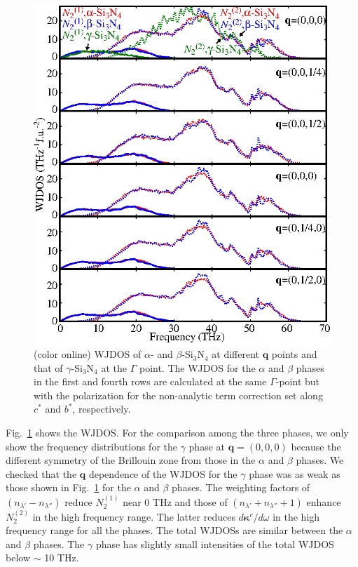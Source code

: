 \documentclass[twocolumn,amsmath,amssymb,a4paper,prb,superscriptaddress,floatfix]{revtex4-1}
\begin{document}
\begin{figure}[ht]
 \centering
  \includegraphics[width=0.9\linewidth]{figure_wjdoss.eps} \caption{(color
	  online) WJDOS of $\alpha$- and $\beta$-Si$_3$N$_4$ at different $\mathbf
	  q$ points and that of $\gamma$-Si$_3$N$_4$ at the $\Gamma$ point. 
  The WJDOS for the $\alpha$ and $\beta$ phases in the  first and fourth rows
  are calculated at the same $\Gamma$-point but 
  with the polarization for the non-analytic term correction set along $c^*$ and
  $b^*$, respectively. \label{fig:Fig6_338} }
 \centering
\end{figure}

Fig.~\ref{fig:Fig6_338} shows the WJDOS.  For the comparison among the three
phases, we only show the frequency distributions for the $\gamma$ phase at
$\mathbf{q}=(0,0,0)$ because the different symmetry of the Brillouin zone from
those in the $\alpha$ and $\beta$ phases. We checked that  the $\mathbf{q}$
dependence of the WJDOS for the $\gamma$ phase was as weak as those shown in
Fig.~\ref{fig:Fig6_338} for the $\alpha$ and $\beta$ phases. The weighting
factors of $(n_{\lambda'}-n_{\lambda''})$ reduce $N_2^{(1)}$ near 0 THz and
those of $(n_{\lambda'}+n_{\lambda''}+1)$ enhance $N_2^{(2)}$ in the high
frequency range. The latter reduces $d\boldsymbol{\kappa}^c/d\omega$ in the
high frequency range for all the phases.  The total WJDOSs are similar between
the $\alpha$ and $\beta$ phases.  The $\gamma$ phase has slightly small
intensities of the total WJDOS below $\sim$ 10 THz.
\end{document}
